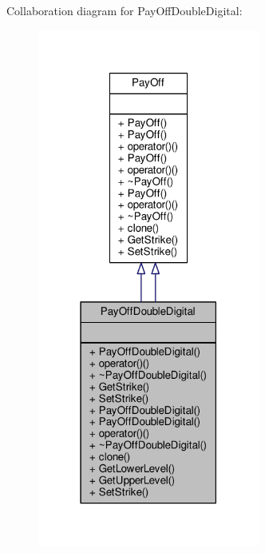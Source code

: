 Collaboration diagram for Pay\+Off\+Double\+Digital\+:
\nopagebreak
\begin{figure}[H]
\begin{center}
\leavevmode
\includegraphics[width=207pt]{classPayOffDoubleDigital__coll__graph}
\end{center}
\end{figure}
